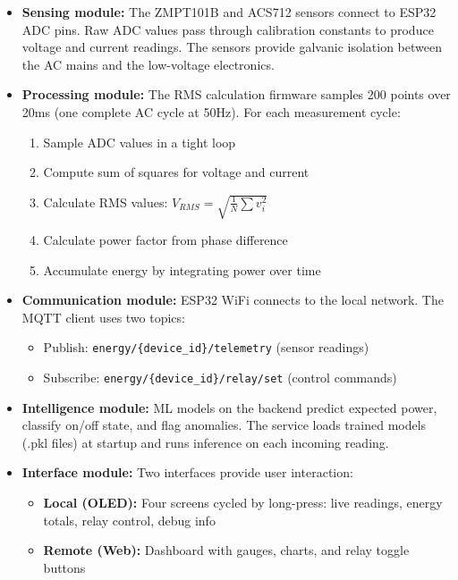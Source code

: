 \documentclass[12pt, a4paper]{article}
\begin{document}
	\begin{itemize}[itemsep=6pt, topsep=6pt]
		\item \textbf{Sensing module:} The ZMPT101B and ACS712 sensors connect to ESP32 ADC pins. Raw ADC values pass through calibration constants to produce voltage and current readings. The sensors provide galvanic isolation between the AC mains and the low-voltage electronics.
		
		\item \textbf{Processing module:} The RMS calculation firmware samples 200 points over 20ms (one complete AC cycle at 50Hz). For each measurement cycle:
		\begin{enumerate}[itemsep=1pt, topsep=2pt]
			\item Sample ADC values in a tight loop
			\item Compute sum of squares for voltage and current
			\item Calculate RMS values: $V_{RMS} = \sqrt{\frac{1}{N}\sum v_i^2}$
			\item Calculate power factor from phase difference
			\item Accumulate energy by integrating power over time
		\end{enumerate}
		
		\item \textbf{Communication module:} ESP32 WiFi connects to the local network. The MQTT client uses two topics:
		\begin{itemize}[itemsep=1pt, topsep=2pt]
			\item Publish: \texttt{energy/\{device\_id\}/telemetry} (sensor readings)
			\item Subscribe: \texttt{energy/\{device\_id\}/relay/set} (control commands)
		\end{itemize}
		
		\item \textbf{Intelligence module:} ML models on the backend predict expected power, classify on/off state, and flag anomalies. The service loads trained models (.pkl files) at startup and runs inference on each incoming reading.

		\newpage
		\item \textbf{Interface module:} Two interfaces provide user interaction:
		\begin{itemize}[itemsep=1pt, topsep=2pt]
			\item \textbf{Local (OLED):} Four screens cycled by long-press: live readings, energy totals, relay control, debug info
			\item \textbf{Remote (Web):} Dashboard with gauges, charts, and relay toggle buttons
		\end{itemize}
	\end{itemize}
	
\end{document}
